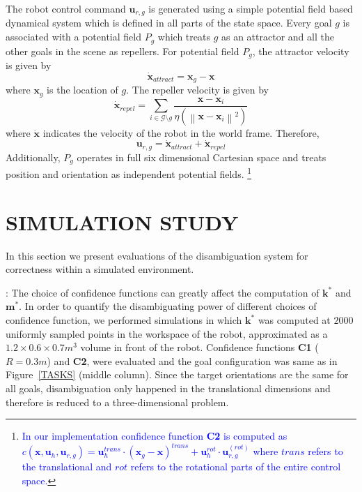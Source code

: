 \documentclass[conference]{IEEEtran}
\newcommand{\norm}[1]{\left\lVert#1\right\rVert}
\begin{document}
The robot control command $\boldsymbol{u}_{r,g}$ is generated using a simple potential field based dynamical system which is defined in all parts of the state space. Every goal $g$ is associated with a potential field $P_g$ which treats $g$ as an attractor and all the other goals in the scene as repellers. For potential field $P_g$, the attractor velocity is given by
\begin{equation*}
\dot{\boldsymbol{x}}_{attract} = \boldsymbol{x}_{g} - \boldsymbol{x}
\end{equation*}
where $\boldsymbol{x}_{g}$ is the location of $g$. The repeller velocity is given by
\begin{equation*}
\dot{\boldsymbol{x}}_{repel} = \sum_{i \in \mathcal{G} \setminus g} \frac{\boldsymbol{x} - \boldsymbol{x}_{i}}{\eta(\norm{\boldsymbol{x} - \boldsymbol{x}_{i}}^2)}
\end{equation*}
where $\dot{\boldsymbol{x}}$ indicates the velocity of the robot in the world frame. Therefore, 
\begin{equation*}
\boldsymbol{u}_{r,g} = \dot{\boldsymbol{x}}_{attract} + \dot{\boldsymbol{x}}_{repel} 
\end{equation*}
Additionally, $P_g$ operates in full six dimensional Cartesian space and treats position and orientation as independent potential fields. \footnote{\textcolor{blue}{In our implementation confidence function \textbf{C2} is computed as
	$c(\boldsymbol{x}, \boldsymbol{u}_h, \boldsymbol{u}_{r,g}) = \boldsymbol{u}_{h}^{trans}\cdot(\boldsymbol{x}_{g} - \boldsymbol{x})^{trans} + \boldsymbol{u}_h^{rot}\cdot\boldsymbol{u}_{r,g}^{(rot)}$
	where $trans$ refers to the translational and $rot$ refers to the rotational parts of the entire control space.}}

\section{SIMULATION STUDY} \label{SIMRESULTS}
In this section we present evaluations of the disambiguation system for correctness within a simulated environment.

: The choice of confidence functions can greatly affect the computation of $\boldsymbol{k}^*$ and $\boldsymbol{m}^*$. In order to quantify the disambiguating power of different choices of confidence function, we performed simulations in which $\boldsymbol{k}^*$ was computed at $2000$ uniformly sampled points in the workspace of the robot, approximated as a $1.2\times0.6\times0.7 m^3$ volume in front of the robot. Confidence functions \textbf{C1} ($R=0.3m$) and \textbf{C2}, were evaluated and the goal configuration was same as in Figure~\ref{TASKS} (middle column). Since the target orientations are the same for all goals, disambiguation only happened in the translational dimensions and therefore is reduced to a three-dimensional problem. 
\end{document}
